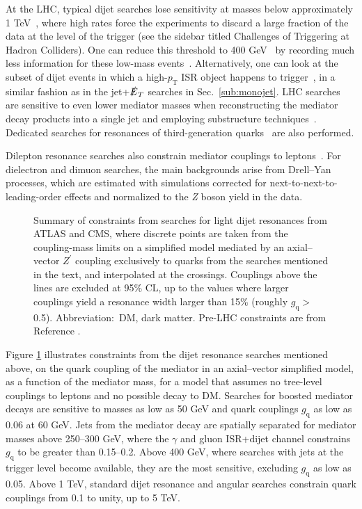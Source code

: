 \documentclass{ar-1col}
\newcommand{\gq}{$g_{\mathrm{q}}$\xspace}
\newcommand{\pt}{\ensuremath{p_\mathrm{T}}\xspace}
\newcommand{\MET}{\ensuremath{\slashed{E}_T}\xspace}
\begin{document}
At the LHC, typical dijet searches lose sensitivity at masses
below approximately 1 TeV~\cite{An:2012ue,Dobrescu:2013coa}, where high
rates force the experiments to discard a large fraction of the
data at the level of the trigger (see the sidebar titled Challenges of Triggering at Hadron Colliders). 
One can reduce this threshold to 400
GeV~\cite{CMS-PAS-EXO-16-056,ATLAS:2016xiv} by recording much less
information for these low-mass
events~\cite{Aaij:2016rxn,CMS-PAS-EXO-16-056,Aaboud:2016leb}.
Alternatively, one can look at the subset of dijet events in which a
high-\pt{} ISR object happens to
trigger~\cite{ATLAS:2016bvn,Sirunyan:2017nvi}, in a similar fashion as in
the jet+\MET searches in Sec.~\ref{sub:monojet}. 
LHC searches are sensitive to even lower mediator masses when
reconstructing the mediator decay products into a single jet and
employing substructure techniques~\cite{Sirunyan:2017nvi,Aaboud:2018zba}. 
Dedicated searches for resonances of third-generation
quarks~\cite{lowMassDiB,CMS-PAS-HIG-16-025,Aaboud:2017hnm} are
also performed.

Dilepton resonance searches also constrain mediator couplings to
leptons~\cite{Aaboud:2017buh,Khachatryan:2016zqb}. For dielectron
and dimuon searches, the main backgrounds arise from Drell--Yan
processes, which are estimated with simulations corrected for next-to-next-to-leading-order
effects and normalized to the \textit{Z} boson yield in the data.

\begin{figure}[!htpb]
\caption{Summary of constraints from searches for light dijet
resonances from ATLAS and CMS, where discrete points are taken
from the coupling-mass limits on a simplified model mediated by an
axial--vector $Z^\prime$ coupling exclusively to quarks from the
searches mentioned in the text, and interpolated at the crossings.
Couplings above the lines are excluded at 95\% CL, up to the
values where larger couplings yield a resonance width larger than
15\% (roughly \gq $>$ 0.5). Abbreviation:\ DM, dark matter. Pre-LHC constraints are from Reference .}\label{fig:couplingmass}
\end{figure}

Figure \ref{fig:couplingmass} illustrates constraints from the
dijet resonance searches mentioned above, on the quark coupling of
the mediator in an axial--vector simplified model, as a function of
the mediator mass, for a model that assumes no tree-level
couplings to leptons and no possible decay to DM. Searches for
boosted mediator decays are sensitive to masses as low as 50 GeV
and quark couplings \gq as low as 0.06 at 60 GeV. Jets from the
mediator decay are spatially separated for mediator masses above
250--300 GeV, where the $\gamma$ and gluon ISR+dijet channel
constrains \gq to be greater than 0.15--0.2. Above 400 GeV, where searches with
jets at the trigger level become available, they are the most
sensitive, excluding \gq as low as 0.05. Above 1 TeV, standard
dijet resonance and angular searches constrain quark couplings
from 0.1 to unity, up to 5 TeV.
\end{document}
